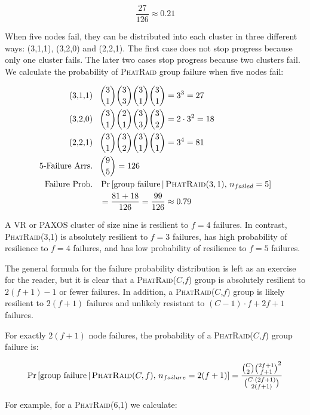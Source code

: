 \documentclass[10pt,letter]{article}
\newcommand{\phatraid}[0]{\textsc{PhatRaid}}
\newcommand{\phatraidcf}[2]{\textsc{PhatRaid}(#1,#2)}
\begin{document}
    $$ \frac{27}{126} \approx 0.21 $$

When five nodes fail, they can be distributed into each cluster in three different
ways: (3,1,1), (3,2,0) and (2,2,1). The first case does not stop progress
because only one cluster fails. The later two cases stop progress because two
clusters fail. We calculate the probability of \phatraid{} group failure when
five nodes fail:

\begin{align*}
  \textrm{(3,1,1)}\;\;\;
    &\binom{3}{1}\binom{3}{3}\binom{3}{1}\binom{3}{1} = 3^3 = 27 \\
  \textrm{(3,2,0)}\;\;\;
    &\binom{3}{1}\binom{2}{1}\binom{3}{3}\binom{3}{2} = 2\cdot3^2 = 18 \\
  \textrm{(2,2,1)}\;\;\;
    &\binom{3}{1}\binom{3}{2}\binom{3}{1}\binom{3}{1} = 3^4 = 81 \\
  \textrm{5-Failure Arrs.}\;\;\;
    &\binom{9}{5} = 126 \\
  \textrm{Failure Prob.}\;\;\;
    &\Pr\left[\textrm{group failure} \,|\, \phatraidcf{3}{1},\, n_{failed} = 5\right] \\
    &= \frac{81 + 18}{126} = \frac{99}{126} \approx 0.79 \\
\end{align*}

A VR or PAXOS cluster of size nine is resilient to $f = 4$ failures. In
contrast, \phatraidcf{3}{1} is absolutely resilient to $f=3$ failures, has high
probability of resilience to $f=4$ failures, and has low probability of
resilience to $f=5$ failures.

The general formula for the failure probability distribution is left
as an exercise for the reader, but
it is clear that a \phatraidcf{$C$}{$f$} group is absolutely resilient to $2(f +
1) - 1$ or fewer failures. In addition, a \phatraidcf{$C$}{$f$} group is likely resilient
to $2(f+1)$ failures and unlikely resistant to $(C-1)\cdot f + 2f + 1$ failures.

For exactly $2(f+1)$ node failures, the probability of a \phatraidcf{$C$}{$f$}
group failure is:

\begin{align*}
  \Pr\left[\textrm{group failure} \,|\, \phatraidcf{C}{f},\, n_{failure}=2(f+1)\right]
    =
  \frac{\binom{C}{2}\binom{2f+1}{f+1}^2}
       {\binom{C \cdot (2f+1)}{2(f+1)}}
\end{align*}

For example, for a \phatraidcf{6}{1} we calculate:
\end{document}
